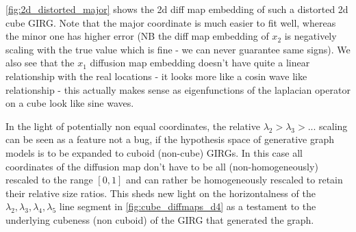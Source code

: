 \cref{fig:2d_distorted_major} shows the 2d diff map embedding of such a distorted 2d cube GIRG. Note that the major coordinate is much easier to fit well, whereas the minor one has higher error (NB the diff map embedding of $x_2$ is negatively scaling with the true value which is fine - we can never guarantee same signs).
We also see that the $x_1$ diffusion map embedding doesn't have quite a linear relationship with the real locations - it looks more like a cosin wave like relationship - this actually makes sense as eigenfunctions of the laplacian operator on a cube look like sine waves.


In the light of potentially non equal coordinates, the relative $\lambda_2 > \lambda_3 > ...$ scaling can be seen as a feature not a bug, if the hypothesis space of generative graph models is to be expanded to cuboid (non-cube) GIRGs. In this case all coordinates of the diffusion map don't have to be all (non-homogeneously) rescaled to the range $[0, 1]$ and can rather be homogeneously rescaled to retain their relative size ratios.
This sheds new light on the horizontalness of the $\lambda_2, \lambda_3, \lambda_4, \lambda_5$ line segment in \cref{fig:cube_diffmaps_d4} as a testament to the underlying cubeness (non cuboid) of the GIRG that generated the graph.








